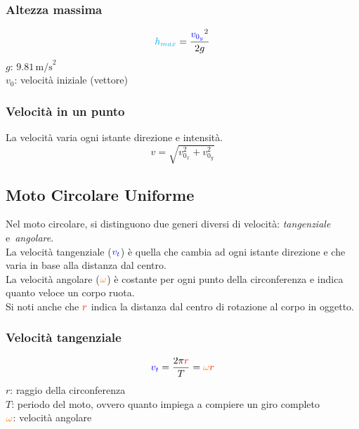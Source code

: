 \subsubsection{Altezza massima}
\begin{equation*}
  \mathcolor{cyan}{h_{max}} = \frac{\mathcolor{blue}{v_{0_y}}^2}{2g}
\end{equation*}
\hyperref[tab:g]{$g$}: $9.81\,\text{m/s}^2$\\
$v_0$: velocità iniziale (vettore)

\subsubsection{Velocità in un punto}
La velocità varia ogni istante direzione e intensità.
\begin{equation*}
  v = \sqrt{v_{0_x}^2+v_{0_y}^2}
\end{equation*}

\subsection{Moto Circolare Uniforme}\label{subsec:mcu}
\begin{center}
\end{center}
Nel moto circolare, si distinguono due generi diversi di velocità: \emph{tangenziale} e\
\emph{angolare}.\\[\baselineskip]
La velocità tangenziale ($\mathcolor{blue}{v_t}$) è quella che cambia ad ogni istante direzione e che varia in base alla distanza dal centro.\\
La velocità angolare ($\mathcolor{orange}{\omega}$) è costante per ogni punto della circonferenza e 
indica quanto veloce un corpo ruota.\\[\baselineskip]
Si noti anche che $\mathcolor{red}{r}$ indica la distanza dal centro di rotazione al corpo in oggetto.
\\[\baselineskip]
\subsubsection{Velocità tangenziale}
\begin{equation*}
  \mathcolor{blue}{v_t} = \frac{2\pi\mathcolor{red}{r}}{T} =
  \mathcolor{orange}{\omega}\mathcolor{red}{r}
\end{equation*}
$r$: raggio della circonferenza\\
$T$: periodo del moto, ovvero quanto impiega a compiere un giro completo\\
$\mathcolor{orange}{\omega}$: velocità angolare


